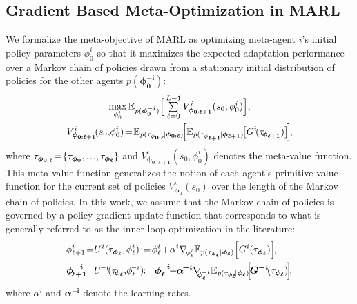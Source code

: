 \subsection{Gradient Based Meta-Optimization in MARL}
We formalize the meta-objective of MARL as optimizing meta-agent $i$'s initial policy parameters $\phi^{i}_{0}$ so that it maximizes the expected adaptation performance over a Markov chain of policies drawn from a stationary initial distribution of policies for the other agents $p(\bm{\phi}^{\bm{-i}}_{\bm{0}})$:
\begin{gather}
\max_{\phi^{i}_{0}}\mathbb{E}_{p(\bm{\phi}^{\bm{-i}}_{\bm{0}})}\Big[\smallsum_{\ell=0}^{L-1}V^{i}_{\bm{\phi}_{\bm{0}:\bm{\ell+1}}}(s_0,\phi^{i}_{0})\Big],\label{eqn:meta-value-function}\\
V^{i}_{\bm{\phi}_{\bm{0:\ell+1}}}\!(s_0,\!\phi^{i}_{0})\!=\!\mathbb{E}_{p(\tau_{\bm{\phi}_{\bm{0:\ell}}}\!|\bm{\phi}_{\bm{0:\ell}})}\!\Big[\mathbb{E}_{p(\tau_{\bm{\phi}_{\bm{\ell+1}}}\!|\bm{\phi}_{\bm{\ell+1}})}\!\big[G^{i}\!(\tau_{\!\bm{\phi}_{\bm{\ell+1}}})\big]\!\Big]\nonumber\!,
\end{gather}
where $\tau_{\bm{\phi}_{\bm{0:\ell}}}\!=\!\{\tau_{\bm{\phi}_{\bm{0}}},\sdots,\tau_{\bm{\phi}_{\bm{\ell}}}\}$ and $V^{i}_{\bm{\phi}_{\bm{0:\ell+1}}}(s_0,\phi^{i}_{0})$ denotes the meta-value function.
This meta-value function generalizes the notion of each agent's primitive value function for the current set of policies $V^{i}_{\bm{\phi}_{\bm{0}}}(s_{0})$ over the length of the Markov chain of policies. 
In this work, we assume that the Markov chain of policies is governed by a policy gradient update function that corresponds to what is generally referred to as the inner-loop optimization in the literature:
\begin{align}\label{eqn:inner-loop}
\begin{split}
\phi^{i}_{\ell+1}\!=& U^{i}(\tau_{\bm{\phi}_{\bm{\ell}}},\phi^{i}_{\ell})\!:=\!\phi^{i}_{\ell}\!+\!\alpha^i\nabla_{\!\phi^{i}_{\ell}}\mathbb{E}_{p(\tau_{\bm{\phi}_{\bm{\ell}}}|\bm{\phi}_{\bm{\ell}})}\Big[G^{i}(\tau_{\bm{\phi}_{\bm{\ell}}})\Big]\!,\\
\bm{\phi}^{\bm{-i}}_{\!\bm{\ell+1}}\!\!=& U^{\!-i}\!(\tau_{\!\bm{\phi}_{\bm{\ell}}},\!\phi^{\!-i}_{\ell})\!\!:=\!\bm{\phi}^{\!\bm{-i}}_{\bm{\ell}}\!\!+\!\hspace{-0.1em}\bm{\alpha}^{\!\bm{-i}}\nabla_{\!\!\!\bm{\phi}^{\!\bm{-i}}_{\bm{\ell}}}\mathbb{E}_{p(\tau_{\bm{\phi}_{\bm{\ell}}}\!|\bm{\phi}_{\bm{\ell}})}\!\hspace{-0.1em}\Big[\!\bm{G}^{\bm{-i}}\!(\tau_{\bm{\phi}_{\bm{\ell}}})\!\Big]\!,
\raisetag{38pt}
\end{split}
\end{align}
where $\alpha^i$ and $\bm{\alpha}^{\bm{-i}}$ denote the learning rates.

